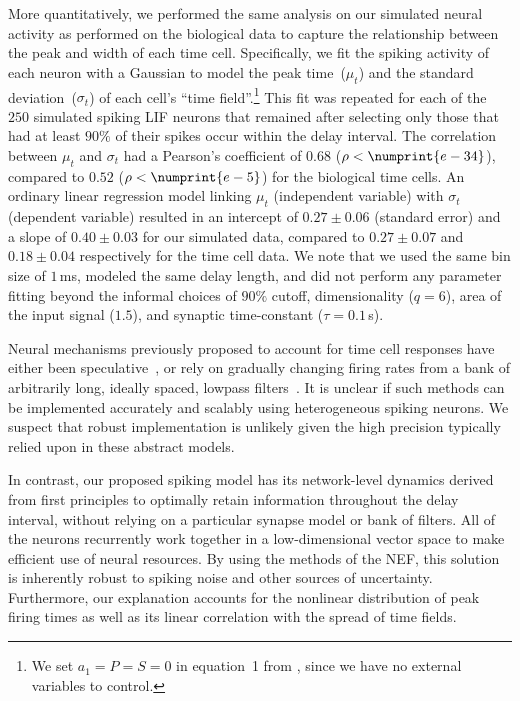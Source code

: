 More quantitatively, we performed the same analysis on our simulated neural activity as \citet{tiganj2016sequential} performed on the biological data to capture the relationship between the peak and width of each time cell.
Specifically, we fit the spiking activity of each neuron with a Gaussian to model the peak time~($\mu_t$) and the standard deviation~($\sigma_t$) of each cell's ``time field''.\footnote{
We set $a_1 = P = S = 0$ in equation~1 from \citet{tiganj2016sequential}, since we have no external variables to control.
}
This fit was repeated for each of the $250$ simulated spiking LIF neurons that remained after selecting only those that had at least $90\%$ of their spikes occur within the delay interval.
The correlation between $\mu_t$ and $\sigma_t$ had a Pearson's coefficient of $0.68$ ($\rho < \numprint{e-34}$), compared to $0.52$ ($\rho < \numprint{e-5}$) for the biological time cells.
An ordinary linear regression model linking $\mu_t$ (independent variable) with $\sigma_t$ (dependent variable) resulted in an intercept of $0.27 \pm 0.06$ (standard error) and a slope of $0.40 \pm 0.03$ for our simulated data, compared to $0.27 \pm 0.07$ and $0.18 \pm 0.04$ respectively for the time cell data.
We note that we used the same bin size of $1$\,ms, modeled the same delay length, and did not perform any parameter fitting beyond the informal choices of $90\%$ cutoff, dimensionality ($q=6$), area of the input signal ($1.5$), and synaptic time-constant ($\tau = 0.1$\,s).

Neural mechanisms previously proposed to account for time cell responses have either been speculative~\citep{tiganj2016sequential},
or rely on gradually changing firing rates from a bank of arbitrarily long, ideally spaced, lowpass filters~\citep{shankar2012scale, howard2014unified, tiganj2015simple, tiganj2017neural}.
It is unclear if such methods can be implemented accurately and scalably using heterogeneous spiking neurons.
We suspect that robust implementation is unlikely given the high precision typically relied upon in these abstract models.

In contrast, our proposed spiking model has its network-level dynamics derived from first principles to optimally retain information throughout the delay interval, without relying on a particular synapse model or bank of filters.
All of the neurons recurrently work together in a low-dimensional vector space to make efficient use of neural resources.
By using the methods of the NEF, this solution is inherently robust to spiking noise and other sources of uncertainty.
Furthermore, our explanation accounts for the nonlinear distribution of peak firing times as well as its linear correlation with the spread of time fields.

